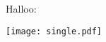 \documentclass{article}
\begin{document}
Halloo:
\begin{center}
  \texttt{[image: single.pdf]}
\end{center}

\end{document}
